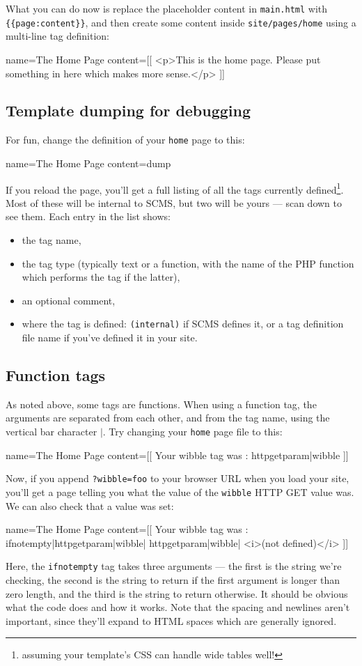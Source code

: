 What you can do now is replace the placeholder content in \texttt{main.html}
with \verb+{{page:content}}+, and then create some content inside 
\texttt{site/pages/home} using a multi-line tag definition:
\begin{MyVerbatim}
name=The Home Page
content=[[
    <p>This is the home page. Please put something in here
    which makes more sense.</p>
]]
\end{MyVerbatim}

\subsection{Template dumping for debugging}
For fun, change the definition of your \texttt{home} page to this:
\begin{MyVerbatim}
name=The Home Page
content={{dump}}
\end{MyVerbatim}
If you reload the page, you'll get a full listing of all the tags currently defined\footnote{assuming
your template's CSS can handle wide tables well!}. Most of these
will be internal to SCMS, but two will be yours --- scan down to see them. Each entry in the list shows:
\begin{itemize}
\item the tag name,
\item the tag type (typically text or a function, with the name of the PHP function which performs the
tag if the latter),
\item an optional comment,
\item where the tag is defined: \texttt{(internal)} if SCMS defines it, or a tag definition file name if
you've defined it in your site.
\end{itemize}
\subsection{Function tags}
As noted above, some tags are functions. When using a function tag, the arguments are separated
from each other, and from the tag name, using the vertical bar character $\vert$. 
Try changing your \texttt{home} page file to this:
\begin{MyVerbatim}
name=The Home Page
content=[[
    Your wibble tag was : {{httpgetparam|wibble}}
]]
\end{MyVerbatim}
Now, if you append \texttt{?wibble=foo} to your browser URL when you load your site, you'll
get a page telling you what the value of the \texttt{wibble} HTTP GET value was. We can also check
that a value was set:
\begin{MyVerbatim}
name=The Home Page
content=[[
    Your wibble tag was : {{ifnotempty|{{httpgetparam|wibble}}|
                                {{httpgetparam|wibble}}|
                                <i>(not defined)</i>
                          }}
]]
\end{MyVerbatim}
Here, the \texttt{ifnotempty} tag takes three arguments --- the first is the string we're checking,
the second is the string to return if the first argument is longer than zero length, and the third
is the string to return otherwise. It should be obvious what the code does and how it works.
Note that the spacing and newlines aren't important, since they'll expand to HTML spaces which are
generally ignored.

